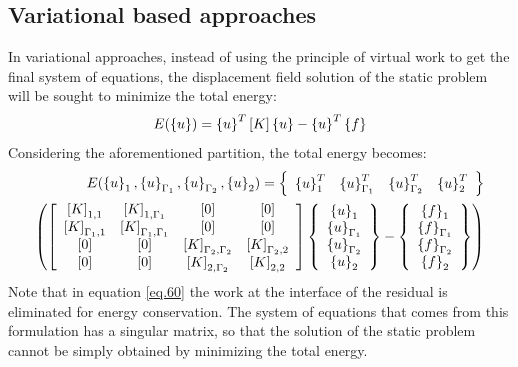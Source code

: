 \subsection{Variational based approaches}\label{ssec34}
In variational approaches, instead of using the principle of virtual work to get the final system of equations, the displacement field solution of the static problem will be sought to minimize the total energy:
\begin{equation}
\label{eq.59}
E(\left\lbrace{u}\right \rbrace)=\left\lbrace{u}\right \rbrace^T\left[{K}\right]\left\lbrace{u}\right \rbrace-\left\lbrace{u}\right \rbrace^T\left\lbrace{f}\right \rbrace
\end{equation}
Considering the aforementioned partition, the total energy becomes:
\begin{equation}
\label{eq.60}
\begin{aligned}
E( \left\lbrace{u}\right \rbrace_1,\left\lbrace{u}\right \rbrace_{\Gamma_1},\left\lbrace{u}\right \rbrace_{\Gamma_2},\left\lbrace{u}\right \rbrace_2
    )=\left\lbrace\begin{array}{cccc} \left\lbrace{u}\right \rbrace_1^T&\left\lbrace{u}\right \rbrace_{\Gamma_1}^T&\left\lbrace{u}\right \rbrace_{\Gamma_2}^T&\left\lbrace{u}\right \rbrace_2^T
    \end{array}\right\rbrace \\\left(\left[ \begin{array}{cccc} 
    \left[{K}\right]_{1,1} & \left[{K}\right]_{1,\Gamma_1} & \left[{0}\right]& \left[{0}\right] \\
   \left[{K}\right]_{\Gamma_1,1} & \left[{K}\right]_{\Gamma_1,\Gamma_1} & \left[{0}\right]& \left[{0}\right]\\ \left[{0}\right]& \left[{0}\right]& \left[{K}\right]_{\Gamma_2,\Gamma_2}&\left[{K}\right]_{\Gamma_2,2}\\   
    \left[{0}\right] & \left[{0}\right]& \left[{K}\right]_{2,\Gamma_2} & \left[{K}\right]_{2,2}\end{array} \right]\left\lbrace\begin{array}{c} \left\lbrace{u}\right \rbrace_1\\\left\lbrace{u}\right \rbrace_{\Gamma_1}\\\left\lbrace{u}\right \rbrace_{\Gamma_2}\\\left\lbrace{u}\right \rbrace_2
    \end{array}\right\rbrace
    -\left\lbrace\begin{array}{c} \left\lbrace{f}\right \rbrace_1\\\left\lbrace{f}\right \rbrace_{\Gamma_1}\\\left\lbrace{f}\right \rbrace_{\Gamma_2}\\\left\lbrace{f}\right \rbrace_2
    \end{array}\right\rbrace\right)
\end{aligned}
\end{equation}
Note that in equation \eqref{eq.60} the work at the interface of the residual is eliminated for energy conservation. The system of equations that comes from this formulation has a singular matrix, so that the solution of the static problem cannot be simply obtained by minimizing the total energy.
